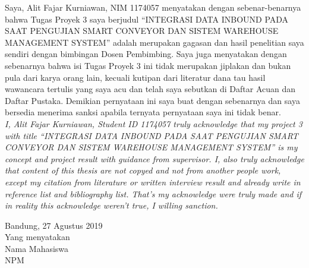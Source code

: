 \sloppy

\begin{halaman}
\thispagestyle{plain}

Saya, Alit Fajar Kurniawan, NIM 1174057 menyatakan dengan sebenar-benarnya bahwa Tugas Proyek 3 saya berjudul ``INTEGRASI DATA INBOUND PADA SAAT PENGUJIAN SMART CONVEYOR DAN SISTEM WAREHOUSE MANAGEMENT SYSTEM'' adalah merupakan gagasan dan hasil penelitian saya sendiri dengan bimbingan Dosen Pembimbing.
Saya juga menyatakan dengan sebenarnya bahwa isi Tugas Proyek 3 ini tidak merupakan jiplakan dan bukan pula dari karya orang lain, kecuali kutipan dari literatur dana tau hasil wawancara tertulis yang saya acu dan telah saya sebutkan di Daftar Acuan dan Daftar Pustaka.
Demikian pernyataan ini saya buat dengan sebenarnya dan saya bersedia menerima sanksi apabila ternyata pernyataan saya ini tidak benar. \\[2ex]
\textit{I, Alit Fajar Kurniawan, Student ID 1174057 truly acknowledge that my project 3 with title ``INTEGRASI DATA INBOUND PADA SAAT PENGUJIAN SMART CONVEYOR DAN SISTEM WAREHOUSE MANAGEMENT SYSTEM'' is my concept and project result with guidance from supervisor.
I, also truly acknowledge that content of this thesis are not copyed and not from another people work, except my citation from literature or written interview result and already write in reference list and bibliography list. 
That’s my acknowledge were truly made and if in reality this acknowledge weren’t true, I willing sanction.}
\begin{flushright}
Bandung, 27 Agustus 2019\\
Yang menyatakan \\[11ex]

Nama Mahasiswa \\
NPM
\end{flushright}

\end{halaman}